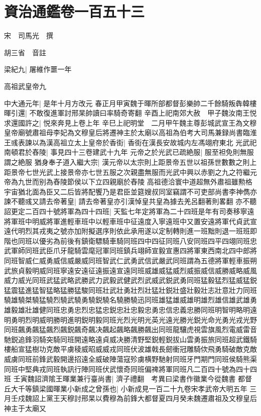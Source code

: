 \section{資治通鑑卷一百五十三}
宋　司馬光　撰

胡三省　音註

梁紀九|{
	屠維作噩一年}


高祖武皇帝九

中大通元年|{
	是年十月方改元}
春正月甲寅魏于暉所部都督彭樂帥二千餘騎叛犇韓樓暉引還|{
	不敢復進軍討邢杲帥讀曰率騎奇寄翻}
辛酉上祀南郊大赦　甲子魏汝南王悦求還國許之|{
	悦來奔見上卷上年}
辛巳上祀明堂　二月甲午魏主尊彭城武宣王為文穆皇帝廟號肅祖母李妃為文穆皇后將遷神主於太廟以高祖為伯考大司馬兼録尚書臨淮王彧表諫以為漢高祖立太上皇帝於香街|{
	香街在漢長安故城内左馮翊府東北}
光武祀南頓君於舂陵|{
	事見四十三卷建武十九年}
元帝之於光武已疏絶服|{
	服至袒免則無服謂之絶服}
猶身奉子道入繼大宗|{
	漢元帝以太宗則上距景帝五世以祖孫世數數之則上距景帝七世光武上接景帝亦七世五服之次親盡無服而光武中興以赤劉之九之符繼元帝為九世而别為舂陵節侯以下立四親廟於舂陵}
高祖德洽寰中道超無外肅祖雖勲格宇宙猶北面為臣又二后皆將配饗乃是君臣並筵嫂叔同室竊謂不可吏部尚書李神儁亦諫不聽彧又請去帝著皇|{
	請去帝著皇亦引漢悼皇共皇為據去羌呂翻著則畧翻}
亦不聽　詔更定二百四十號將軍為四十四班|{
	天監七年定將軍為二十四班是年有司奏移寧遠將軍班中明威將軍進輕車班中以輕車班中征遠度入寧遠班中又置安遠將軍代貞武宣遠代明烈其戎夷之號亦加附擬選序則依此承用遂以定制轉則進一班黜則退一班班即階也同班以優劣為前後有鎮衛驃騎車騎同班四中四征同班八安同班四平四翊同班忠武軍師同班武臣爪牙龍騎雲麾冠軍同班鎮兵翊師宣毅宣惠四將軍東西南北四中郎將同班智威仁威勇威信威嚴威同班智武仁武勇武信武嚴武同班謂為五德將軍輕車振朔武旅貞毅明威同班寧遠安遠征遠振遠宣遠同班威雄威猛威烈威振威信威勝威略威風威力威光同班武猛武略武勝武力武毅武健武烈武威武鋭武勇同班猛毅猛烈猛威猛鋭猛震猛進猛智猛略猛勝猛駿同班壯武壯勇壯烈壯猛壯鋭壯盛壯毅壯志壯意壯力同班驍雄驍桀驍猛驍烈驍武驍勇驍鋭驍名驍勝驍迅同班雄猛雄威雄明雄烈雄信雄武雄勇雄毅雄壯雄健同班忠勇忠烈忠猛忠鋭忠壯忠毅忠勇忠信忠義忠勝同班明智明略明遠明勇明烈明威明勝明進明鋭明毅同班光烈光明光英光遠光勝光鋭光命光勇光戎光野同班飆勇飆猛飆烈飆鋭飆奇飆决飆起飆略飆勝飆出同班龍驤虎視雲旗風烈電威雷音馳鋭追鋒羽騎突騎同班開遠略遠貞威决勝清野堅鋭輕鋭拔山雲勇振旅同班超武鐵騎樓船宣猛樹功克敵平虜稜威昭威威戎同班伏波雄戟長劒衝冠雕騎佽飛勇騎破敵克敵威虜同班前鋒武毅開邊招遠全威破陣蕩寇殄虜横野馳射同班牙門期門同班侯騎熊渠同班中堅典戎同班執訊行陣同班伏武懷奇同班偏禆將軍同班凡二百四十號為四十四班}
壬寅魏詔濟隂王暉業兼行臺尚書|{
	濟子禮翻　考異曰梁書作徽業今從魏書}
都督丘大千等鎮梁國暉業小新成之曾孫也|{
	小新成見一百二十九卷宋孝武帝大明五年}
三月壬戍魏詔上黨王天穆討邢杲以費穆為前鋒大都督夏四月癸未魏遷肅祖及文穆皇后神主于太廟又

